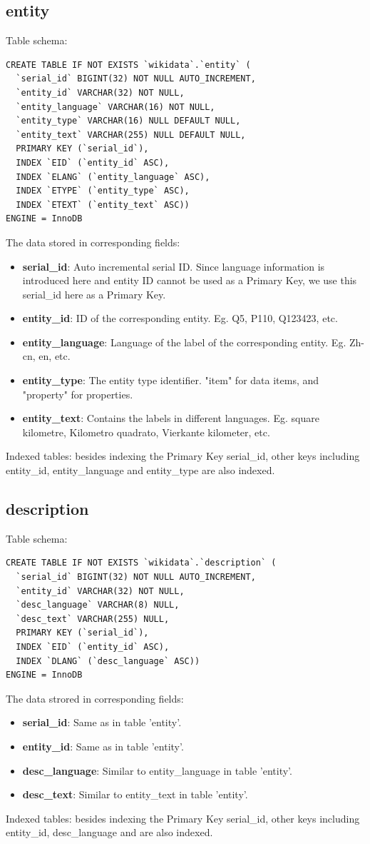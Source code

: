 \documentclass[12pt]{article}
\begin{document}
\subsection{entity}
Table schema:
\lstset{language=SQL}
\begin{lstlisting}
CREATE TABLE IF NOT EXISTS `wikidata`.`entity` (
  `serial_id` BIGINT(32) NOT NULL AUTO_INCREMENT,
  `entity_id` VARCHAR(32) NOT NULL,
  `entity_language` VARCHAR(16) NOT NULL,
  `entity_type` VARCHAR(16) NULL DEFAULT NULL,
  `entity_text` VARCHAR(255) NULL DEFAULT NULL,
  PRIMARY KEY (`serial_id`),
  INDEX `EID` (`entity_id` ASC),
  INDEX `ELANG` (`entity_language` ASC),
  INDEX `ETYPE` (`entity_type` ASC),
  INDEX `ETEXT` (`entity_text` ASC))
ENGINE = InnoDB
\end{lstlisting}
The data stored in corresponding fields:
\begin{itemize}
\item \textbf{serial\_id}: Auto incremental serial ID. Since language information is introduced here and entity ID cannot be used as a Primary Key, we use this serial\_id here as a Primary Key.
\item \textbf{entity\_id}: ID of the corresponding entity. Eg. Q5, P110, Q123423, etc.
\item \textbf{entity\_language}: Language of the label of the corresponding entity. Eg. Zh-cn, en, etc.
\item \textbf{entity\_type}: The entity type identifier. "item" for data items, and "property" for properties.
\item \textbf{entity\_text}: Contains the labels in different languages. Eg. square kilometre, Kilometro quadrato, Vierkante kilometer, etc.
\end{itemize}
Indexed tables: besides indexing the Primary Key serial\_id, other keys including entity\_id, entity\_language and entity\_type are also indexed.
\subsection{description}
\lstset{language=SQL}
Table schema:
\begin{lstlisting}
CREATE TABLE IF NOT EXISTS `wikidata`.`description` (
  `serial_id` BIGINT(32) NOT NULL AUTO_INCREMENT,
  `entity_id` VARCHAR(32) NOT NULL,
  `desc_language` VARCHAR(8) NULL,
  `desc_text` VARCHAR(255) NULL,
  PRIMARY KEY (`serial_id`),
  INDEX `EID` (`entity_id` ASC),
  INDEX `DLANG` (`desc_language` ASC))
ENGINE = InnoDB
\end{lstlisting}
The data strored in corresponding fields:
\begin{itemize}
\item \textbf{serial\_id}: Same as in table 'entity'.
\item \textbf{entity\_id}: Same as in table 'entity'.
\item \textbf{desc\_language}: Similar to entity\_language in table 'entity'.
\item \textbf{desc\_text}: Similar to entity\_text in table 'entity'.
\end{itemize}
Indexed tables: besides indexing the Primary Key serial\_id, other keys including entity\_id, desc\_language and are also indexed.
\end{document}
